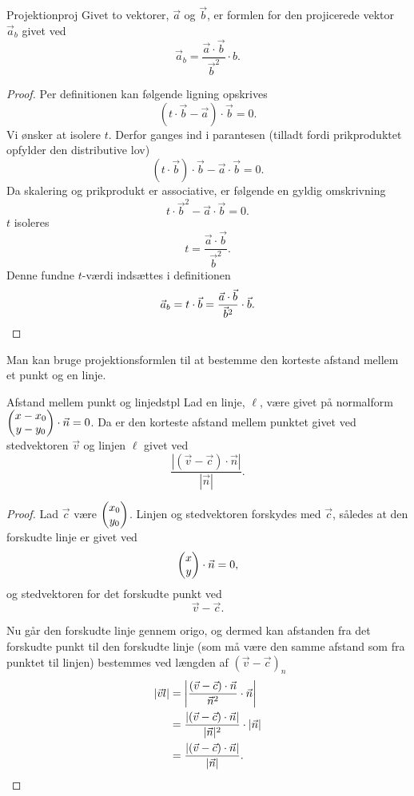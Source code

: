 \documentclass{article}
\begin{document}
\begin{theorem}{Projektion}{proj}
	Givet to vektorer, $\vec{a}$ og $\vec{b}$, er formlen for den projicerede
	vektor $\vec{a}_b$ givet ved 
	\[
		\vec{a}_b = \frac{\vec{a} \cdot \vec{b}}{\vec{b}^2} \cdot b.
	\] 
\end{theorem}

\begin{proof}
Per definitionen kan følgende ligning opskrives
\[
	(t \cdot \vec{b} - \vec{a}) \cdot \vec{b} = 0.
\] 
Vi ønsker at isolere $t$. Derfor ganges ind i parantesen (tilladt fordi
prikproduktet opfylder den distributive lov)
\[
	(t \cdot \vec{b}) \cdot \vec{b} - \vec{a} \cdot \vec{b} = 0.
\] 
Da skalering og prikprodukt er associative, er følgende en gyldig omskrivning
\[
	t \cdot \vec{b}^2 - \vec{a} \cdot \vec{b} = 0.
\] 
$t$ isoleres
\[
	t = \frac{\vec{a} \cdot \vec{b}}{\vec{b}^2}.
\] 
Denne fundne $t$-værdi indsættes i definitionen
\[
	\vec{a}_b = t \cdot \vec{b} = \frac{\vec{a} \cdot \vec{b}}{\vec{b}^2} \cdot \vec{b}.\qedhere
\] 
\end{proof}

Man kan bruge projektionsformlen til at bestemme den korteste afstand mellem et
punkt og en linje.

\smallskip

\begin{theorem}{Afstand mellem punkt og linje}{dstpl}
	Lad en linje, $\ell$, være givet på normalform $ \begin{pmatrix} x - x_0\\ y - y_0 \end{pmatrix} 
	\cdot \vec{n} = 0$. Da er den korteste afstand mellem punktet givet ved
	stedvektoren $\vec{v}$ og linjen $\ell$ givet ved
	\[
		\frac{|(\vec{v} - \vec{c}) \cdot \vec{n}|}{|\vec{n}|}.
	\] 
\end{theorem}

\begin{proof}
	Lad $\vec{c}$ være $ \begin{pmatrix} x_0\\ y_0 \end{pmatrix} $. Linjen og stedvektoren forskydes
	med $\vec{c}$, således at den forskudte linje er givet ved
	\[
		 \begin{pmatrix} x\\ y \end{pmatrix}  \cdot \vec{n} = 0,
	\] 
	og stedvektoren for det forskudte punkt ved
	\[
		\vec{v} - \vec{c}.
	\] 

	Nu går den forskudte linje gennem origo, og dermed kan afstanden fra det
	forskudte punkt til den forskudte linje (som må være den samme afstand som
	fra punktet til linjen) bestemmes ved længden af $(\vec{v} -
	\vec{c})_{n}$
	\begin{align*}
		|\vec{v}l| &= \left| \frac{(\vec{v} - \vec{c}) \cdot \vec{n}}{\vec{n}^2} \cdot \vec{n} \right|\\
				   &= \frac{|(\vec{v} - \vec{c}) \cdot \vec{n}|}{|\vec{n}|^2} \cdot |\vec{n}|\\
				   &= \frac{|(\vec{v} - \vec{c}) \cdot \vec{n}|}{|\vec{n}|}.\qedhere
	\end{align*}
\end{proof}
\end{document}

